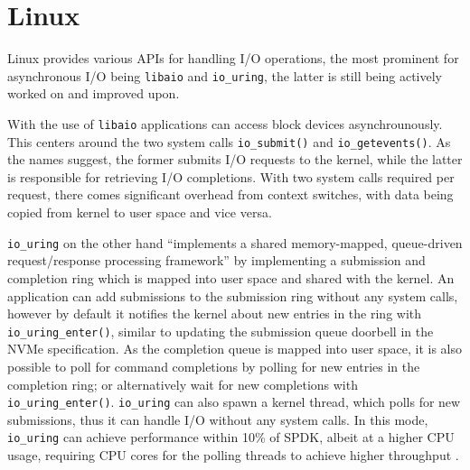 \section{Linux}
Linux provides various APIs for handling I/O operations, the most prominent for asynchronous I/O being \texttt{libaio} and \texttt{io\_uring}, the latter is still being actively worked on and improved upon.

With the use of \texttt{libaio} applications can access block devices asynchrounously. This centers around the two system calls \texttt{io\_submit()} and \texttt{io\_getevents()}. As the names suggest, the former submits I/O requests to the kernel, while the latter is responsible for retrieving I/O completions. With two system calls required per request, there comes significant overhead from context switches, with data being copied from kernel to user space and vice versa.

\texttt{io\_uring} on the other hand ``implements a shared memory-mapped, queue-driven request/response processing framework'' \cite{storage_api} by implementing a submission and completion ring which is mapped into user space and shared with the kernel. An application can add submissions to the submission ring without any system calls, however by default it notifies the kernel about new entries in the ring with \texttt{io\_uring\_enter()}, similar to updating the submission queue doorbell in the NVMe specification. As the completion queue is mapped into user space, it is also possible to poll for command completions by polling for new entries in the completion ring; or alternatively wait for new completions with \texttt{io\_uring\_enter()}. \texttt{io\_uring} can also spawn a kernel thread, which polls for new submissions, thus it can handle I/O without any system calls. In this mode, \texttt{io\_uring} can achieve performance within 10\% of SPDK, albeit at a higher CPU usage, requiring CPU cores for the polling threads to achieve higher throughput \cite{storage_api}.
